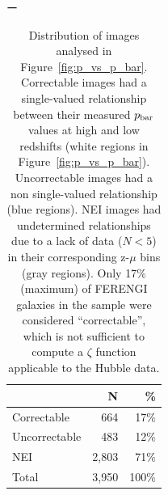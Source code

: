 \documentclass[twocolumn]{aastex6}
\begin{document}
\begin{table}ー
\caption{Distribution of \ferengi{} images analysed in Figure~\ref{fig:p_vs_p_bar}. Correctable images had a single-valued relationship between their measured $p_{\rm bar}$ values at high and low redshifts (white regions in Figure~\ref{fig:p_vs_p_bar}). Uncorrectable images had a non single-valued relationship (blue regions). NEI images had undetermined relationships due to a lack of data ($N<5$) in their corresponding z-$\mu$ bins (gray regions). Only 17\% (maximum) of FERENGI galaxies in the sample were considered ``correctable'', which is not sufficient to compute a $\zeta$ function applicable to the Hubble data.   \label{tbl:ferengi_bar_corrections}}
\begin{tabular}{lrr}
\hline \hline
				                   & N       & \% \\
\hline 
Correctable                        & 664   & 17\% \\
Uncorrectable                      & 483   & 12\% \\
NEI                                & 2,803     & 71\%\\
Total                              & 3,950   & 100\% \\
\hline \hline
\end{tabular}
\end{table}
\end{document}
